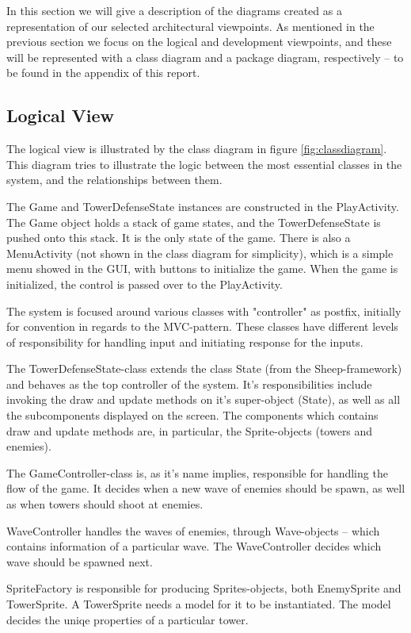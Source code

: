 In this section we will give a description of the diagrams created as a representation of our selected architectural viewpoints. As mentioned in the previous section we focus on the logical and development viewpoints, and these will be represented with a class diagram and a package diagram, respectively -- to be found in the appendix of this report.

\subsection{Logical View}

The logical view is illustrated by the class diagram in figure \ref{fig:classdiagram}. This diagram tries to illustrate the logic between the most essential classes in the system, and the relationships between them. 

The Game and TowerDefenseState instances are constructed in the PlayActivity. The Game object holds a stack of game states, and the TowerDefenseState is pushed onto this stack. It is the only state of the game. There is also a MenuActivity (not shown in the class diagram for simplicity), which is a simple menu showed in the GUI, with buttons to initialize the game. When the game is initialized, the control is passed over to the PlayActivity.

The system is focused around various classes with "controller" as postfix, initially for convention in regards to the MVC-pattern. 
These classes have different levels of responsibility for handling input and initiating response for the inputs.

The TowerDefenseState-class extends the class State (from the Sheep-framework) and behaves as the top controller of the system. It's responsibilities include invoking the draw and update methods on it's super-object (State), as well as all the subcomponents displayed on the screen. The components which contains draw and update methods are, in particular, the Sprite-objects (towers and enemies).

The GameController-class is, as it's name implies, responsible for handling the flow of the game. It decides when a new wave of enemies should be spawn, as well as when towers should shoot at enemies.  

WaveController handles the waves of enemies, through Wave-objects -- which contains information of a particular wave. The WaveController decides which wave should be spawned next.

SpriteFactory is responsible for producing Sprites-objects, both EnemySprite and TowerSprite. A TowerSprite needs a model for it to be instantiated. The model decides the uniqe properties of a particular tower. 


